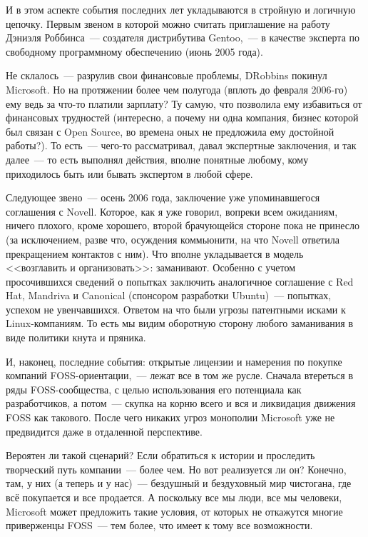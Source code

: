 И в этом аспекте события последних лет укладываются в стройную и логичную цепочку. Первым звеном в которой можно считать приглашение на работу Дэниэля Роббинса~--- создателя дистрибутива Gentoo,~--- в качестве эксперта по свободному программному обеспечению (июнь 2005 года).

Не склалось~--- разрулив свои финансовые проблемы, DRobbins покинул Microsoft. Но на протяжении более чем полугода (вплоть до февраля 2006-го) ему ведь за что-то платили зарплату? Ту самую, что позволила ему избавиться от финансовых трудностей (интересно, а почему ни одна компания, бизнес которой был связан с Open Source, во времена оных не предложила ему достойной работы?). То есть~--- чего-то рассматривал, давал экспертные заключения, и так далее~--- то есть выполнял действия, вполне понятные любому, кому приходилось быть или бывать экспертом в любой сфере.

Следующее звено~--- осень 2006 года, заключение уже упоминавшегося соглашения с Novell. Которое, как я уже говорил, вопреки всем ожиданиям, ничего плохого, кроме хорошего, второй брачующейся стороне пока не принесло (за исключением, разве что, осуждения коммьюнити, на что Novell ответила прекращением контактов с ним). Что вполне укладывается в модель <<возглавить и организовать>>: заманивают. Особенно с учетом просочившихся сведений о попытках заключить аналогичное соглашение с Red Hat, Mandriva и Canonical (спонсором разработки Ubuntu)~--- попытках, успехом не увенчавшихся. Ответом на что были угрозы патентными исками к Linux-компаниям. То есть мы видим оборотную сторону любого заманивания в виде политики кнута и пряника.

И, наконец, последние события: открытые лицензии и намерения по покупке компаний FOSS-ориентации,~--- лежат все в том же русле. Сначала втереться в ряды FOSS-сообщества, с целью использования его потенциала как разработчиков, а потом~--- скупка на корню всего и вся и ликвидация движения FOSS как такового. После чего никаких угроз монополии Microsoft уже не предвидится даже в отдаленной перспективе.

Вероятен ли такой сценарий? Если обратиться к истории и проследить творческий путь компании~--- более чем. Но вот реализуется ли он? Конечно, там, у них (а теперь и у нас)~--- бездушный и бездуховный мир чистогана, где всё покупается и все продается. А поскольку все мы люди, все мы человеки, Microsoft может предложить такие условия, от которых не откажутся многие приверженцы FOSS~--- тем более, что имеет к тому все возможности.

